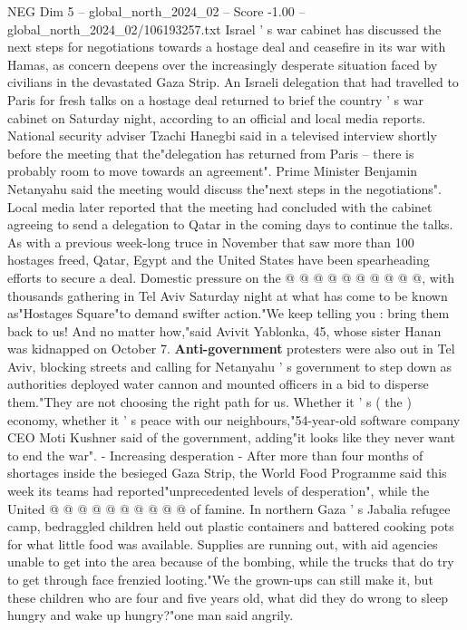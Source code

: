 \begin{textsample}{NEG Dim 5 – global\_north\_2024\_02 – Score -1.00 – global\_north\_2024\_02/106193257.txt}  \label{ex:f5_neg_212}
Israel ' s war cabinet has discussed the next steps for negotiations towards a hostage deal and ceasefire in its war with Hamas, as concern deepens over the increasingly desperate situation faced by civilians in the devastated Gaza Strip.
An Israeli delegation that had travelled to Paris for fresh talks on a hostage deal returned to brief the country ' s war cabinet on Saturday night, according to an official and local media reports.
National security adviser Tzachi Hanegbi said in a televised interview shortly before the meeting that the"delegation has returned from Paris -- there is probably room to move towards an agreement".
Prime Minister Benjamin Netanyahu said the meeting would discuss the"next steps in the negotiations".
Local media later reported that the meeting had concluded with the cabinet agreeing to send a delegation to Qatar in the coming days to continue the talks.
As with a previous week-long truce in November that saw more than 100 hostages freed, Qatar, Egypt and the United States have been spearheading efforts to secure a deal.
Domestic pressure on the @ @ @ @ @ @ @ @ @ @, with thousands gathering in Tel Aviv Saturday night at what has come to be known as"Hostages Square"to demand swifter action."We keep telling you : bring them back to us!
And no matter how,"said Avivit Yablonka, 45, whose sister Hanan was kidnapped on October 7. \textbf{Anti-government} protesters were also out in Tel Aviv, blocking streets and calling for Netanyahu ' s government to step down as authorities deployed water cannon and mounted officers in a bid to disperse them."They are not choosing the right path for us.
Whether it ' s ( the ) economy, whether it ' s peace with our neighbours,"54-year-old software company CEO Moti Kushner said of the government, adding"it looks like they never want to end the war". - Increasing desperation - After more than four months of shortages inside the besieged Gaza Strip, the World Food Programme said this week its teams had reported"unprecedented levels of desperation", while the United @ @ @ @ @ @ @ @ @ @ of famine.
In northern Gaza ' s Jabalia refugee camp, bedraggled children held out plastic containers and battered cooking pots for what little food was available.
Supplies are running out, with aid agencies unable to get into the area because of the bombing, while the trucks that do try to get through face frenzied looting."We the grown-ups can still make it, but these children who are four and five years old, what did they do wrong to sleep hungry and wake up hungry?"one man said angrily.

\end{textsample}
